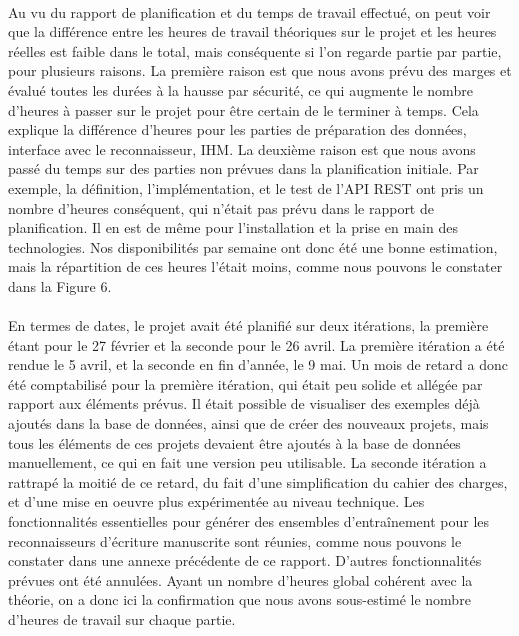\paragraph{}
Au vu du rapport de planification et du temps de travail effectué, on peut voir que la différence entre les heures de travail théoriques sur le projet et les heures réelles est faible dans le total, mais conséquente si l'on regarde partie par partie, pour plusieurs raisons. La première raison est que nous avons prévu des marges et évalué toutes les durées à la hausse par sécurité, ce qui augmente le nombre d'heures à passer sur le projet pour être certain de le terminer à temps. Cela explique la différence d'heures pour les parties de préparation des données, interface avec le reconnaisseur, IHM. La deuxième raison est que nous avons passé du temps sur des parties non prévues dans la planification initiale. Par exemple, la définition, l'implémentation, et le test de l'API REST ont pris un nombre d'heures conséquent, qui n'était pas prévu dans le rapport de planification. Il en est de même pour l'installation et la prise en main des technologies. Nos disponibilités par semaine ont donc été une bonne estimation, mais la répartition de ces heures l'était moins, comme nous pouvons le constater dans la Figure 6.

\paragraph{}
En termes de dates, le projet avait été planifié sur deux itérations, la première étant pour le 27 février et la seconde pour le 26 avril. La première itération a été rendue le 5 avril, et la seconde en fin d'année, le 9 mai. Un mois de retard a donc été comptabilisé pour la première itération, qui était peu solide et allégée par rapport aux éléments prévus. Il était possible de visualiser des exemples déjà ajoutés dans la base de données, ainsi que de créer des nouveaux projets, mais tous les éléments de ces projets devaient être ajoutés à la base de données manuellement, ce qui en fait une version peu utilisable. La seconde itération a rattrapé la moitié de ce retard, du fait d'une simplification du cahier des charges, et d'une mise en oeuvre plus expérimentée au niveau technique. Les fonctionnalités essentielles pour générer des ensembles d'entraînement pour les reconnaisseurs d'écriture manuscrite sont réunies, comme nous pouvons le constater dans une annexe précédente de ce rapport. D'autres fonctionnalités prévues ont été annulées. Ayant un nombre d'heures global cohérent avec la théorie, on a donc ici la confirmation que nous avons sous-estimé le nombre d'heures de travail sur chaque partie.

